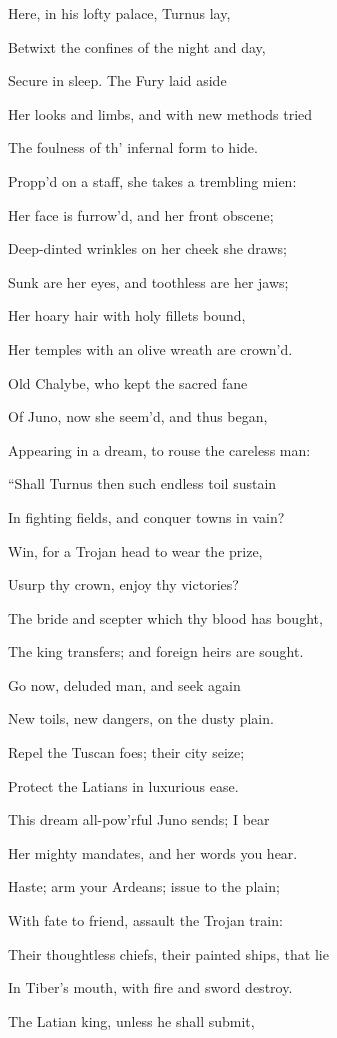 Here, in his lofty palace, Turnus lay,

Betwixt the confines of the night and day,

Secure in sleep. The Fury laid aside

Her looks and limbs, and with new methods tried

The foulness of th’ infernal form to hide.

Propp’d on a staff, she takes a trembling mien:

Her face is furrow’d, and her front obscene;

Deep-dinted wrinkles on her cheek she draws;

Sunk are her eyes, and toothless are her jaws;

Her hoary hair with holy fillets bound,

Her temples with an olive wreath are crown’d.

Old Chalybe, who kept the sacred fane

Of Juno, now she seem’d, and thus began,

Appearing in a dream, to rouse the careless man:

“Shall Turnus then such endless toil sustain

In fighting fields, and conquer towns in vain?

Win, for a Trojan head to wear the prize,

Usurp thy crown, enjoy thy victories?

The bride and scepter which thy blood has bought,

The king transfers; and foreign heirs are sought.

Go now, deluded man, and seek again

New toils, new dangers, on the dusty plain.

Repel the Tuscan foes; their city seize;

Protect the Latians in luxurious ease.

This dream all-pow’rful Juno sends; I bear

Her mighty mandates, and her words you hear.

Haste; arm your Ardeans; issue to the plain;

With fate to friend, assault the Trojan train:

Their thoughtless chiefs, their painted ships, that lie

In Tiber’s mouth, with fire and sword destroy.

The Latian king, unless he shall submit,

